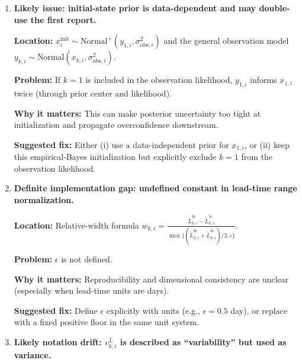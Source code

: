 \documentclass[11pt]{article}
\begin{document}
\begin{enumerate}
  \textbf{Problem:} Centering by the full horizon uses future observations when inference is done sequentially.

  \textbf{Why it matters:} This introduces look-ahead leakage and makes real-time implementation inconsistent with the stated workflow.

  \textbf{Suggested fix:} Use a training-period baseline, rolling baseline, or running mean up to $k$; alternatively state clearly that this centering is retrospective-only.

  \item \textbf{Likely issue: initial-state prior is data-dependent and may double-use the first report.}

  \textbf{Location:} $x^{\mathrm{init}}_i\sim\mathrm{Normal}^+(y_{1,i},\sigma^2_{\mathrm{obs},i})$ and the general observation model $y_{k,i}\sim\mathrm{Normal}(x_{k,i},\sigma^2_{\mathrm{obs},i})$.

  \textbf{Problem:} If $k=1$ is included in the observation likelihood, $y_{1,i}$ informs $x_{1,i}$ twice (through prior center and likelihood).

  \textbf{Why it matters:} This can make posterior uncertainty too tight at initialization and propagate overconfidence downstream.

  \textbf{Suggested fix:} Either (i) use a data-independent prior for $x_{1,i}$, or (ii) keep this empirical-Bayes initialization but explicitly exclude $k=1$ from the observation likelihood.

  \item \textbf{Definite implementation gap: undefined constant in lead-time range normalization.}

  \textbf{Location:} Relative-width formula
  $w_{k,i}=\frac{\tilde L^{\mathrm{hi}}_{k,i}-\tilde L^{\mathrm{lo}}_{k,i}}{\max\{(\tilde L^{\mathrm{hi}}_{k,i}+\tilde L^{\mathrm{lo}}_{k,i})/2,\epsilon\}}$.

  \textbf{Problem:} $\epsilon$ is not defined.

  \textbf{Why it matters:} Reproducibility and dimensional consistency are unclear (especially when lead-time units are days).

  \textbf{Suggested fix:} Define $\epsilon$ explicitly with units (e.g., $\epsilon=0.5$ day), or replace with a fixed positive floor in the same unit system.

  \item \textbf{Likely notation drift: $v^L_{k,i}$ is described as ``variability'' but used as variance.}


\end{enumerate}
\end{document}
